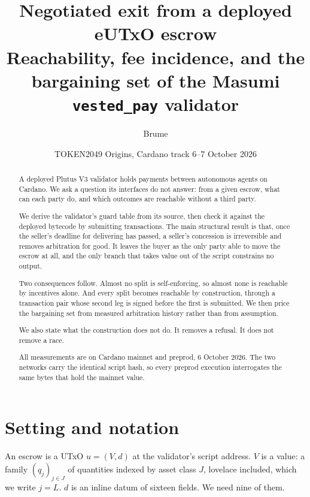 \documentclass[11pt]{article}
\title{\textbf{Negotiated exit from a deployed eUTxO escrow}\\[4pt]
\large Reachability, fee incidence, and the bargaining set of the Masumi \texttt{vested\_pay} validator}
\author{Brume}
\date{TOKEN2049 Origins, Cardano track \textbullet{} 6--7 October 2026}
\theoremstyle{remark}
\begin{document}
\maketitle

\begin{abstract}
\noindent A deployed Plutus V3 validator holds payments between autonomous agents on Cardano. We ask a question its
interfaces do not answer: from a given escrow, what can each party do, and which outcomes are reachable without a
third party.

We derive the validator's guard table from its source, then check it against the deployed bytecode by submitting
transactions. The main structural result is that, once the seller's deadline for delivering has passed, a seller's
concession is irreversible and removes arbitration for good. It leaves the buyer as the only party able to move the
escrow at all, and the only branch that takes value out of the script constrains no output.

Two consequences follow. Almost no split is self-enforcing, so almost none is reachable by incentives alone. And
every split becomes reachable by construction, through a transaction pair whose second leg is signed before the
first is submitted. We then price the bargaining set from measured arbitration history rather than from assumption.

We also state what the construction does not do. It removes a refusal. It does not remove a race.

All measurements are on Cardano mainnet and preprod, 6 October 2026. The two networks carry the identical script
hash, so every preprod execution interrogates the same bytes that hold the mainnet value.
\end{abstract}

\clearpage

\section{Setting and notation}

An escrow is a UTxO $u = (V, d)$ at the validator's script address. $V$ is a value: a family $(q_j)_{j \in J}$ of
quantities indexed by asset class $J$, lovelace included, which we write $j = L$. $d$ is an inline datum of sixteen
fields. We need nine of them.
\end{document}
